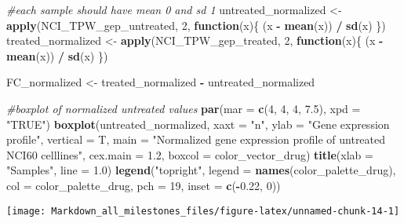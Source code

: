 \documentclass[]{article}
\newenvironment{Shaded}{\begin{snugshade}}{\end{snugshade}}
\newcommand{\CommentTok}[1]{\textcolor[rgb]{0.56,0.35,0.01}{\textit{#1}}}
\newcommand{\ControlFlowTok}[1]{\textcolor[rgb]{0.13,0.29,0.53}{\textbf{#1}}}
\newcommand{\DataTypeTok}[1]{\textcolor[rgb]{0.13,0.29,0.53}{#1}}
\newcommand{\DecValTok}[1]{\textcolor[rgb]{0.00,0.00,0.81}{#1}}
\newcommand{\FloatTok}[1]{\textcolor[rgb]{0.00,0.00,0.81}{#1}}
\newcommand{\KeywordTok}[1]{\textcolor[rgb]{0.13,0.29,0.53}{\textbf{#1}}}
\newcommand{\NormalTok}[1]{#1}
\newcommand{\OperatorTok}[1]{\textcolor[rgb]{0.81,0.36,0.00}{\textbf{#1}}}
\newcommand{\StringTok}[1]{\textcolor[rgb]{0.31,0.60,0.02}{#1}}
\begin{document}
\begin{Shaded}
\begin{Highlighting}[]
\CommentTok{#each sample should have mean 0 and sd 1}
\NormalTok{untreated_normalized <-}\StringTok{ }\KeywordTok{apply}\NormalTok{(NCI_TPW_gep_untreated, }\DecValTok{2}\NormalTok{, }\ControlFlowTok{function}\NormalTok{(x)\{}
\NormalTok{  (x }\OperatorTok{-}\StringTok{ }\KeywordTok{mean}\NormalTok{(x)) }\OperatorTok{/}\StringTok{ }\KeywordTok{sd}\NormalTok{(x)}
\NormalTok{\})}
\NormalTok{treated_normalized <-}\StringTok{ }\KeywordTok{apply}\NormalTok{(NCI_TPW_gep_treated, }\DecValTok{2}\NormalTok{, }\ControlFlowTok{function}\NormalTok{(x)\{}
\NormalTok{  (x }\OperatorTok{-}\StringTok{ }\KeywordTok{mean}\NormalTok{(x)) }\OperatorTok{/}\StringTok{ }\KeywordTok{sd}\NormalTok{(x)}
\NormalTok{\})}

\NormalTok{FC_normalized <-}\StringTok{ }\NormalTok{treated_normalized }\OperatorTok{-}\StringTok{ }\NormalTok{untreated_normalized}

\CommentTok{#boxplot of normalized untreated values}
\KeywordTok{par}\NormalTok{(}\DataTypeTok{mar =} \KeywordTok{c}\NormalTok{(}\DecValTok{4}\NormalTok{, }\DecValTok{4}\NormalTok{, }\DecValTok{4}\NormalTok{, }\FloatTok{7.5}\NormalTok{), }\DataTypeTok{xpd =} \StringTok{"TRUE"}\NormalTok{)}
\KeywordTok{boxplot}\NormalTok{(untreated_normalized, }
        \DataTypeTok{xaxt =} \StringTok{"n"}\NormalTok{, }
        \DataTypeTok{ylab =} \StringTok{"Gene expression profile"}\NormalTok{, }
        \DataTypeTok{vertical =}\NormalTok{  T, }
        \DataTypeTok{main =} \StringTok{"Normalized gene expression profile of untreated NCI60 celllines"}\NormalTok{,}
        \DataTypeTok{cex.main =} \FloatTok{1.2}\NormalTok{, }
        \DataTypeTok{boxcol =}\NormalTok{ color_vector_drug)}
\KeywordTok{title}\NormalTok{(}\DataTypeTok{xlab =} \StringTok{"Samples"}\NormalTok{, }\DataTypeTok{line =} \FloatTok{1.0}\NormalTok{)}
\KeywordTok{legend}\NormalTok{(}\StringTok{"topright"}\NormalTok{,}
       \DataTypeTok{legend =} \KeywordTok{names}\NormalTok{(color_palette_drug), }
       \DataTypeTok{col =}\NormalTok{ color_palette_drug, }
       \DataTypeTok{pch =} \DecValTok{19}\NormalTok{,}
       \DataTypeTok{inset =} \KeywordTok{c}\NormalTok{(}\OperatorTok{-}\FloatTok{0.22}\NormalTok{, }\DecValTok{0}\NormalTok{))}
\end{Highlighting}
\end{Shaded}

\begin{center}\texttt{[image: Markdown\_all\_milestones\_files/figure-latex/unnamed-chunk-14-1]} \end{center}
\end{document}

